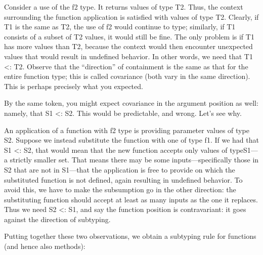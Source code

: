 Consider a use of the f2 type. It returns values of type T2. Thus, the context
surrounding the function application is satisfied with values of type T2.
Clearly, if T1 is the same as T2, the use of f2 would continue to type;
similarly, if T1 consists of a subset of T2 values, it would still be fine. The
only problem is if T1 has more values than T2, because the context would then
encounter unexpected values that would result in undefined behavior. In other
words, we need that T1 <: T2. Observe that the “direction” of containment is the
same as that for the entire function type; this is called covariance (both vary
in the same direction). This is perhaps precisely what you expected.

By the same token, you might expect covariance in the argument position as well:
namely, that S1 <: S2. This would be predictable, and wrong. Let’s see why.

An application of a function with f2 type is providing parameter values of type
S2.
Suppose we instead substitute the function with one of type f1. If we had that
S1 <:
S2, that would mean that the new function accepts only values of typeS1—a
strictly smaller set. That means there may be some inputs—specifically those in
S2 that are not in S1—that the application is free to provide on which the
substituted function is not defined, again resulting in undefined behavior. To
avoid this, we have to make the subsumption go in the other direction: the
substituting function should accept at least as many inputs as the one it
replaces. Thus we need S2 <: S1, and say the function position is contravariant:
it goes against the direction of subtyping.

Putting together these two observations, we obtain a subtyping rule for
functions (and hence also methods):


